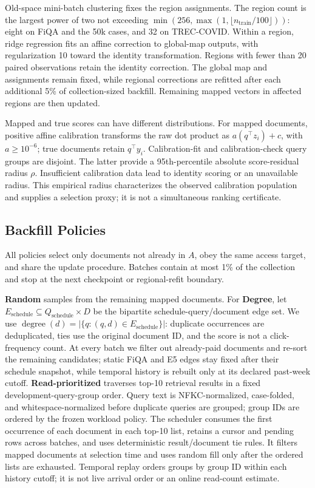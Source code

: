 \documentclass[runningheads]{llncs}
\begin{document}
Old-space mini-batch clustering fixes the region assignments. The region count is the largest power of two not exceeding $\min(256,\max(1,\lfloor n_{\mathrm{train}}/100\rfloor))$: eight on FiQA and the 50k cases, and 32 on TREC-COVID. Within a region, ridge regression fits an affine correction to global-map outputs, with regularization 10 toward the identity transformation. Regions with fewer than 20 paired observations retain the identity correction. The global map and assignments remain fixed, while regional corrections are refitted after each additional 5\% of collection-sized backfill. Remaining mapped vectors in affected regions are then updated.

Mapped and true scores can have different distributions. For mapped documents, positive affine calibration transforms the raw dot product as $a(q^\top z_i)+c$, with $a\geq10^{-6}$; true documents retain $q^\top y_i$. Calibration-fit and calibration-check query groups are disjoint. The latter provide a 95th-percentile absolute score-residual radius $\rho$. Insufficient calibration data lead to identity scoring or an unavailable radius. This empirical radius characterizes the observed calibration population and supplies a selection proxy; it is not a simultaneous ranking certificate.

\subsection{Backfill Policies}

All policies select only documents not already in $A$, obey the same access target, and share the update procedure. Batches contain at most 1\% of the collection and stop at the next checkpoint or regional-refit boundary.

\textbf{Random} samples from the remaining mapped documents. For \textbf{Degree}, let $E_{\mathrm{schedule}}\subseteq Q_{\mathrm{schedule}}\times D$ be the bipartite schedule-query/document edge set. We use $\operatorname{degree}(d)=|\{q:(q,d)\in E_{\mathrm{schedule}}\}|$: duplicate occurrences are deduplicated, ties use the original document ID, and the score is not a click-frequency count. At every batch we filter out already-paid documents and re-sort the remaining candidates; static FiQA and E5 edges stay fixed after their schedule snapshot, while temporal history is rebuilt only at its declared past-week cutoff. \textbf{Read-prioritized} traverses top-10 retrieval results in a fixed development-query-group order. Query text is NFKC-normalized, case-folded, and whitespace-normalized before duplicate queries are grouped; group IDs are ordered by the frozen workload policy. The scheduler consumes the first occurrence of each document in each top-10 list, retains a cursor and pending rows across batches, and uses deterministic result/document tie rules. It filters mapped documents at selection time and uses random fill only after the ordered lists are exhausted. Temporal replay orders groups by group ID within each history cutoff; it is not live arrival order or an online read-count estimate.
\end{document}
